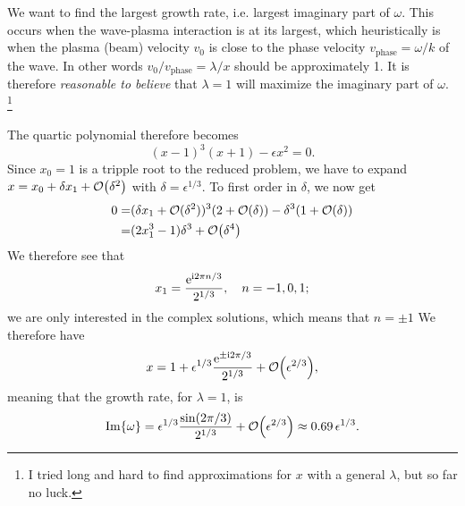 \documentclass[11pt,a4paper, 
swedish, english %
]{article}
\begin{document}
We want to find the largest growth rate, i.e. largest imaginary part
of $\omega$. This occurs when the wave-plasma interaction is at its
largest, which heuristically is when the plasma (beam) velocity $v_0$
is close to the phase velocity $v_\text{phase}=\omega/k$ of the
wave. In other words $v_0/v_\text{phase}=\lambda/x$ should be
approximately 1. It is therefore \emph{reasonable to believe} that
$\lambda=1$ will maximize the imaginary part of $\omega$.
\footnote{I tried long and hard to find approximations for $x$ with a
  general $\lambda$, but so far no luck. }

The quartic polynomial therefore becomes
\begin{equation}
(x-1)^3(x+1)-\epsilon x^2=0.
\end{equation}
Since $x_0=1$ is a tripple root to the reduced problem, we have to
expand $x=x_0+\delta x_1+\order{\delta^2}$ with
$\delta=\epsilon^{1/3}$. To first order in $\delta$, we now get
\begin{equation}
\begin{aligned}
0=&(\delta x_1+\order*{\delta^2})^3(2+\order{\delta})
-\delta^3(1+\order{\delta})\\
=&(2x_1^3-1)\delta^3 + \order{\delta^4}
\end{aligned}
\end{equation}
We therefore see that
\begin{equation}
x_1 = \frac{\ee^{\ii 2\pi n/3}}{2^{1/3}}\qc n=-1, 0, 1;
\end{equation}
we are only interested in the complex solutions, which means that $n=\pm1$
We therefore have\footnotemark{}
\begin{equation}
x=1+\epsilon^{1/3}\frac{\ee^{\pm\ii2\pi/3}}{2^{1/3}}
+\order{\epsilon^{2/3}},
\end{equation}
meaning that the growth rate, for $\lambda=1$, is
\begin{equation}
\Im{\omega} =
\epsilon^{1/3}\frac{\sin(2\pi/3)}{2^{1/3}}+\order{\epsilon^{2/3}}
\approx 0.69\,\epsilon^{1/3}.
\end{equation}

\end{document}
